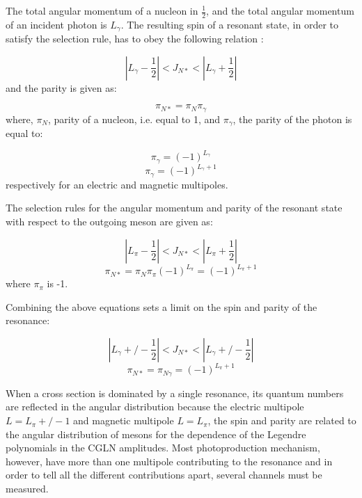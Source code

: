 \indent The total angular momentum of a nucleon in $\frac{1}{2}$, and the total angular momentum of an incident photon is $L_{\gamma}$. The resulting spin of a resonant state, in order to satisfy the selection rule, has to obey the following relation \cite{krusche}:

\begin{equation}
|L_{\gamma}-\frac{1}{2}|<J_{N*}<|L_{\gamma}+\frac{1}{2}|
\end{equation}
and the parity is given as:

\begin{equation}
\pi_{N*}=\pi_{N}\pi_{\gamma}
\end{equation}
where, $\pi_{N}$, parity of a nucleon, i.e. equal to 1, and $\pi_{\gamma}$, the parity of the photon is equal to:

\begin{equation}
\pi_{\gamma}=(-1)^{L_{\gamma}}
\end{equation}
\begin{equation}
\pi_{\gamma}=(-1)^{L_{\gamma}+1}
\end{equation}
respectively for an electric and magnetic multipoles.

\indent The selection rules for the angular momentum and parity of the resonant state with respect to the outgoing meson are given as:

\begin{equation}
|L_{\pi}-\frac{1}{2}|<J_{N*}<|L_{\pi}+\frac{1}{2}|
\end{equation}
\begin{equation}
\pi_{N*}=\pi_{N}\pi_{\pi}(-1)^{L_{\pi}}=(-1)^{L_{\pi}+1}
\end{equation}
where $\pi_{\pi}$ is -1.

\indent Combining the above equations sets a limit on the spin and parity of the resonance:

\begin{equation}
|L_{\gamma}+/-\frac{1}{2}|<J_{N*}<|L_{\gamma}+/-\frac{1}{2}|
\end{equation}
\begin{equation}
\pi_{N*}=\pi_{N\gamma}=(-1)^{L_{\pi}+1}
\end{equation}

\indent When a cross section is dominated by a single resonance, its quantum numbers are reflected in the angular distribution because the electric multipole $L={L_{\pi}+/-1}$ and magnetic multipole $L={L_{\pi}}$, the spin and parity are related to the angular distribution of mesons for the dependence of the Legendre polynomials in the CGLN amplitudes. Most photoproduction mechanism, however, have more than one multipole contributing to the resonance and in order to tell all the different contributions apart, several channels must be measured.

